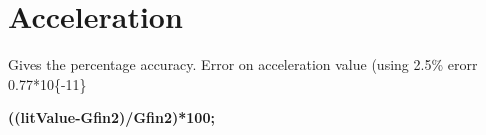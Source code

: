 \documentclass{article}
\begin{document}
\section{\textbf{Acceleration}}
\begin{maplegroup}
\begin{mapleinput}
\end{mapleinput}
\mapleresult
\begin{maplelatex}
\end{maplelatex}
\end{maplegroup}
\begin{maplegroup}
\begin{mapleinput}
\end{mapleinput}
\mapleresult
\begin{maplelatex}
\end{maplelatex}
\end{maplegroup}
\begin{maplegroup}
\begin{mapleinput}
\end{mapleinput}
\mapleresult
\begin{maplelatex}
\end{maplelatex}
\end{maplegroup}
\begin{maplegroup}
\begin{Maple Normal}{
Gives the percentage accuracy. Error on acceleration value (using 2.5\% erorr 0.77*10\{-11\}}\end{Maple Normal}

\textbf{((litValue-Gfin2)/Gfin2)*100;}\mapleresult
\begin{maplelatex}
\end{maplelatex}
\end{maplegroup}
\begin{maplelatex}\begin{Maple Normal}{
}\end{Maple Normal}
\end{maplelatex}
\end{document}

